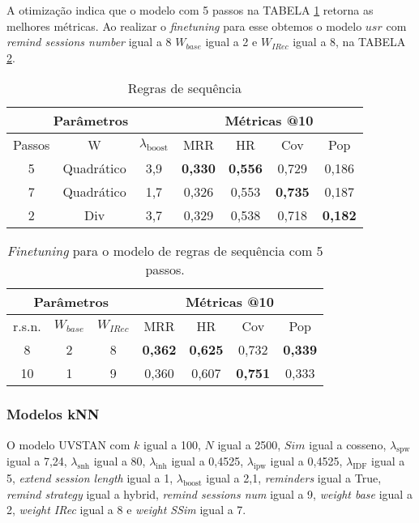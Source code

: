 A otimização indica que o modelo com 5 passos na TABELA \ref{opt:seq_rules}
retorna as melhores métricas. Ao realizar o \textit{finetuning} para esse
obtemos o modelo $usr$ com \textit{remind sessions number} igual a 8 $W_{base}$
igual a 2 e $W_{IRec}$ igual a 8, na TABELA \ref{opt:seq_rules_finetuning}.
\begin{table}
  \centering
  \begin{tabular}{|c|c|c|c|c|c|c|}
    \hline
      \multicolumn{3}{|c|}{Parâmetros} & \multicolumn{4}{c|}{Métricas @10} \\
      \hline
      Passos & W & $\lambda_{\text{boost}}$ & MRR & HR & Cov & Pop \\
      \hline
      5 & Quadrático & 3,9 & \textbf{0,330} & \textbf{0,556} & 0,729 & 0,186 \\
      \hline
      7 & Quadrático & 1,7 & 0,326 & 0,553 & \textbf{0,735} & 0,187 \\
      \hline
      2 & Div & 3,7 & 0,329 & 0,538 & 0,718 & \textbf{0,182} \\
      \hline
      \end{tabular}
      \caption{Regras de sequência}
      \label{opt:seq_rules}
\end{table}

\begin{table}
  \centering
  \begin{tabular}{|c|c|c|c|c|c|c|}
    \hline
      \multicolumn{3}{|c|}{Parâmetros} & \multicolumn{4}{c|}{Métricas @10} \\
      \hline
      r.s.n. & $W_{base}$ & $W_{IRec}$ & MRR & HR & Cov & Pop \\
      \hline
      8 & 2 & 8 & \textbf{0,362} & \textbf{0,625} & 0,732 & \textbf{0,339} \\
    \hline
     10 & 1 & 9 & 0,360 & 0,607 & \textbf{0,751} & 0,333 \\
     \hline
  \end{tabular}
  \caption{\textit{Finetuning} para o modelo de regras de sequência com 5 passos.}
  \label{opt:seq_rules_finetuning}
\end{table}

\subsubsection{Modelos kNN}
O modelo UVSTAN com $k$ igual a 100, $N$ igual a 2500, $Sim$ igual a cosseno,
$\lambda_{\text{spw}}$ igual a 7,24, $\lambda_{\text{snh}}$ igual a 80,
$\lambda_{\text{inh}}$ igual a 0,4525, $\lambda_{\text{ipw}}$ igual a 0,4525,
$\lambda_{\text{IDF}}$ igual a 5, \textit{extend session length} igual a 1,
$\lambda_{\text{boost}}$ igual a 2,1, \textit{reminders} igual a True,
\textit{remind strategy} igual a hybrid, \textit{remind sessions num} igual a 9,
\textit{weight base} igual a 2, \textit{weight IRec} igual a 8 e \textit{weight
SSim} igual a 7.

